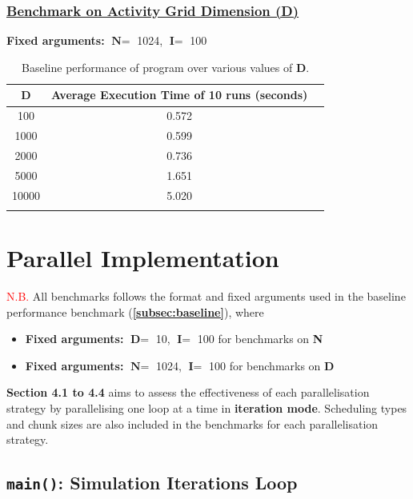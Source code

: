 \documentclass[12pt, a4paper]{article}
\let\oldcref\cref
\renewcommand{\cref}[1]{\textbf{\oldcref{#1}}}
\begin{document}
\subsubsection*{\underline{Benchmark on Activity Grid Dimension (D)}}
\textbf{Fixed arguments:} $\textbf{N} =$ 1024, $\textbf{I} =$ 100
\renewcommand{\arraystretch}{1.3}
\begin{longtable}{|c|c|c|}
  \hline \endfirsthead \rowcolor{lightgray}
  D     & Average Execution Time of 10 runs (seconds) \\ \hline
  100   & 0.572                                       \\
  1000  & 0.599                                       \\
  2000  & 0.736                                       \\
  5000  & 1.651                                       \\
  10000 & 5.020                                       \\ \hline
  \caption{Baseline performance of program over various values of \textbf{D}.}
  \label{table:baseline_d}
\end{longtable}
\renewcommand{\arraystretch}{1}


\newpage
\section{Parallel Implementation} \label{sec:parallel_implementation}

\noindent\textcolor{red}{N.B.} All benchmarks follows the format and fixed arguments
used in the baseline performance benchmark (\cref{subsec:baseline}), where
\begin{itemize}
  \item \textbf{Fixed arguments:} $\textbf{D} =$ 10, $\textbf{I} =$ 100 for benchmarks on \textbf{N}
  \item \textbf{Fixed arguments:} $\textbf{N} =$ 1024, $\textbf{I} =$ 100 for benchmarks on \textbf{D}
\end{itemize}

\textbf{Section 4.1 to 4.4} aims to assess the effectiveness of each parallelisation strategy by
parallelising one loop at a time in \textbf{iteration mode}. Scheduling types and chunk sizes are
also included in the benchmarks for each parallelisation strategy.

\subsection{\texttt{main()}: Simulation Iterations Loop} \label{subsec:iter_loop}
\end{document}
